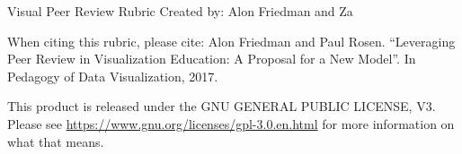 \documentclass[a4paper,12pt]{article}
\begin{document}
\begin{centering}
{ \Large Visual Peer Review Rubric}
{Created by: Alon Friedman and Za}
\end{centering}

When citing this rubric, please cite: Alon Friedman and Paul Rosen. ``Leveraging Peer Review in Visualization Education: A Proposal for a New Model''. In Pedagogy of Data Visualization, 2017.

This product is released under the GNU GENERAL PUBLIC LICENSE, V3. Please see \url{https://www.gnu.org/licenses/gpl-3.0.en.html} for more information on what that means.







\end{document}
